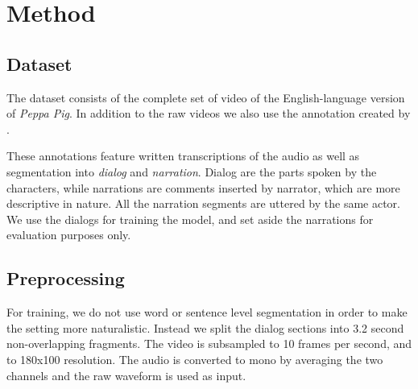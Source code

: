 \section{Method}
\label{sec:method}

\subsection{Dataset}
The dataset consists of the complete set of video of the
English-language version of {\it Peppa Pig}. In addition to the raw
videos we  also use the annotation created by
\citep{papasarantopoulos2021narration}.

These annotations feature written transcriptions of the audio as well
as segmentation into {\it dialog} and {\it narration}. Dialog are the
parts spoken by the characters, while narrations are comments inserted
by narrator, which are more descriptive in nature. All the narration
segments are uttered by the same actor. We use the dialogs for
training the model, and set aside the narrations for evaluation
purposes only.

\subsection{Preprocessing}
For training, we do not use word or sentence level segmentation in
order to make the setting more naturalistic. Instead we split the
dialog sections into 3.2 second non-overlapping fragments. The video
is subsampled to 10 frames per second, and to 180x100 resolution. The
audio is converted to mono by averaging the two channels  and the raw
waveform is used as input.

